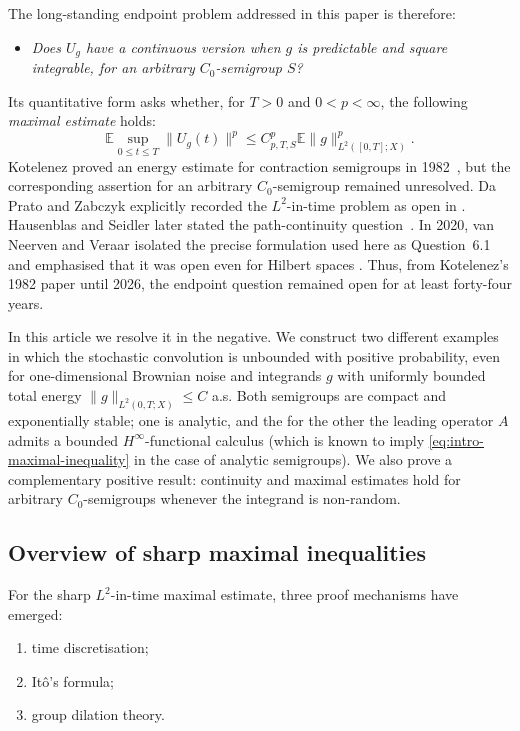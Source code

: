 \documentclass[11pt]{amsart}
\theoremstyle{definition}
\theoremstyle{remark}
\numberwithin{equation}{section}
\newcommand{\E}{\mathbb E}
\newcommand{\1}{\mathbf 1}
\newcommand{\norm}[1]{\lVert #1\rVert}
\begin{document}
The long-standing endpoint problem addressed in this paper is therefore:
\begin{itemize}
    \item {\em Does \(U_g\) have a continuous version when
\(g\) is predictable and square integrable,
for an arbitrary \(C_0\)-semigroup \(S\)?}
\end{itemize}
Its quantitative form asks whether, for \(T>0\) and \(0<p<\infty\), the following \emph{maximal estimate} holds:
\begin{equation}
 \E\sup_{0\leq t\leq T}\norm{U_g(t)}^p
 \leq C_{p,T,S}^p
 \E\norm{g}_{L^2([0,T];X)}^p.
 \label{eq:intro-maximal-inequality}
\end{equation}
Kotelenez proved an energy estimate for contraction semigroups in
1982~\cite{Kotelenez1982}, but the corresponding assertion for an arbitrary
\(C_0\)-semigroup remained unresolved.  Da Prato and Zabczyk explicitly
recorded the \(L^2\)-in-time problem as open in
\cite[p.~144]{DPZ92}.  Hausenblas and Seidler later stated the
path-continuity question~\cite[p.~108]{HausenblasSeidler2008}.  In 2020, van Neerven
and Veraar isolated the precise formulation used here as Question~6.1 and
emphasised that it was open even for Hilbert spaces
\cite{vanNeervenVeraar2020}.  Thus, from Kotelenez's 1982 paper until 2026,
the endpoint question remained open for at least forty-four
years.

In this article we resolve it in the negative. We construct two different examples in which the stochastic convolution is unbounded with positive probability, even for one-dimensional Brownian noise and integrands $g$ with uniformly bounded total energy $\|g\|_{L^2(0,T;X)}\leq C$ a.s. Both semigroups are compact and exponentially stable; one is analytic, and the for the other the leading operator $A$ admits a bounded $H^\infty$-functional calculus (which is known to imply \eqref{eq:intro-maximal-inequality} in the case of analytic semigroups). We also prove a complementary positive result: continuity and maximal estimates hold for arbitrary $C_0$-semigroups whenever the integrand is non-random. 



\subsection{Overview of sharp maximal inequalities}
For the sharp \(L^2\)-in-time maximal estimate, three proof mechanisms have emerged:
\begin{enumerate}[label=\textup{(\arabic*)},leftmargin=*,itemsep=1pt,topsep=3pt]
\item time discretisation;
\item It\^o's formula;
\item group dilation theory.
\end{enumerate}
\end{document}

